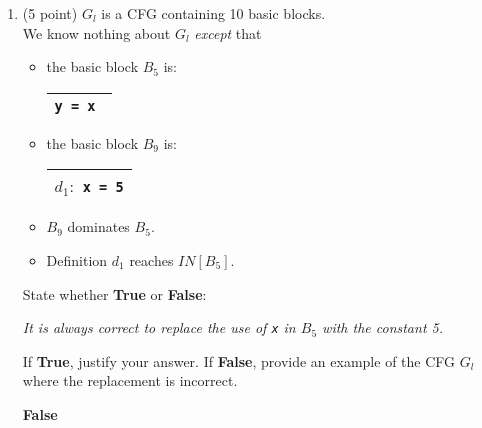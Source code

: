 \documentclass[12pt]{article}
\begin{document}
\begin{enumerate}
        \item  (5 point) $G_l$ is a CFG containing 10 basic blocks. \\We know nothing
        about $G_l$ \emph{except} that 
        
        \begin{itemize}
          \item the basic block $B_5$ is:
        \renewcommand{\arraystretch}{1}
        \begin{tabular}{|c|}
          \hline
          \lstinline$y = x $\\
          \hline
        \end{tabular}
        \item the basic block $B_9$ is:
        \renewcommand{\arraystretch}{1}
        \begin{tabular}{|c|}
          \hline
          $d_1: $ \lstinline$x = 5$\\
          \hline
        \end{tabular}
        \item $B_9$ dominates $B_5$.
        \item Definition $d_1$ reaches  $IN[B_5]$.
      \end{itemize}
    
            
      State whether \textbf{True} or \textbf{False}: 
    
      \emph{It is always correct to replace the use of \lstinline$x$ in $B_5$ 
      with the constant 5.}
    
      If \textbf{True}, justify your answer.
      If \textbf{False}, provide an example of the CFG $G_l$ where the replacement is incorrect.
      \begin{mdframed}
      \textbf{False} 

\end{mdframed}
\end{enumerate}
\end{document}
